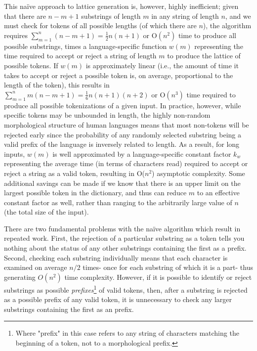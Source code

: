 This naïve approach to lattice generation is, however, highly inefficient; given that there are $n-m+1$ substrings of length $m$ in any string of length $n$, and we must check for tokens of all possible lengths (of which there are $n$), the algorithm requires $\sum_{m=1}^{n}(n-m+1)=\frac{1}{2}n(n+1)$ or O$(n^{2})$ time to produce all possible substrings, times a language-specific function $w(m)$ representing the time required to accept or reject a string of length $m$ to produce the lattice of possible tokens. If $w(m)$ is approximately linear (i.e., the amount of time it takes to accept or reject a possible token is, on average, proportional to the length of the token), this results in $\sum_{m=1}^{n}m(n-m+1)=\frac{1}{6}n(n+1)(n+2)$ or O$(n^{3})$ time required to produce all possible tokenizations of a given input. In practice, however, while specific tokens may be unbounded in length, the highly non-random morphological structure of human languages means that most non-tokens will be rejected early since the probability of any randomly selected substring being a valid prefix of the language is inversely related to length. As a result, for long inputs, $w(m)$ is well approximated by a language-specific constant factor $k_w$ representing the average time (in terms of characters read) required to accept or reject a string as a valid token, resulting in O($n^{2}$) asymptotic complexity. Some additional savings can be made if we know that there is an upper limit on the largest possible token in the dictionary, and thus can reduce $m$ to an effective constant factor as well, rather than ranging to the arbitrarily large value of $n$ (the total size of the input).

There are two fundamental problems with the naïve algorithm which result in repeated work. First, the rejection of a particular substring as a token tells you nothing about the status of any other substrings containing the first as a prefix. Second, checking each substring individually means that each character is examined on average $n/2$ times- once for each substring of which it is a part- thus generating $O(n^{2})$ time complexity. However, if it is possible to identify or reject substrings as possible \textit{prefixes}\footnote{Where "prefix" in this case refers to any string of characters matching the beginning of a token, not to a morphological prefix.} of valid tokens, then, after a substring is rejected as a possible prefix of any valid token, it is unnecessary to check any larger substrings containing the first as an prefix.

